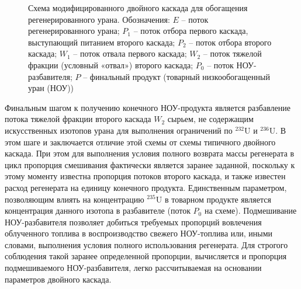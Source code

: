 \begin{figure}[ht]
    \caption{Схема модифицированного двойного каскада для обогащения регенерированного урана. Обозначения: $E$ -- поток регенерированного урана; $P_1$ -- поток отбора первого каскада, выступающий питанием второго каскада; $P_2$ -- поток отбора второго каскада; $W_1$ -- поток отвала первого каскада; $W_2$ -- поток тяжелой фракции (условный «отвал») второго каскада; $P_0$ -- поток НОУ-разбавителя; $P$ -- финальный продукт (товарный низкообогащенный уран (НОУ))}\label{p2left}
\end{figure}

Финальным шагом к получению конечного НОУ-продукта является разбавление потока тяжелой фракции второго каскада $W_2$ сырьем, не содержащим искусственных изотопов урана для выполнения ограничений по $^{232}$U и $^{236}$U. В этом шаге и заключается отличие этой схемы от схемы типичного двойного каскада. При этом для выполнения условия полного возврата массы регенерата в цикл пропорция смешивания фактически является заранее заданной, поскольку к этому моменту известна пропорция потоков второго каскада, и также известен расход регенерата на единицу конечного продукта. Единственным параметром, позволяющим влиять на концентрацию $^{235}$U в товарном продукте является концентрация данного изотопа в разбавителе (поток $P_0$ на схеме).
Подмешивание НОУ-разбавителя позволяет добиться требуемых пропорций вовлечения облученного топлива в воспроизводство свежего НОУ-топлива или, иными словами, выполнения условия полного использования регенерата. Для строгого соблюдения такой заранее определенной пропорции, вычисляется и пропорция подмешиваемого НОУ-разбавителя, легко рассчитываемая на основании параметров двойного каскада.


